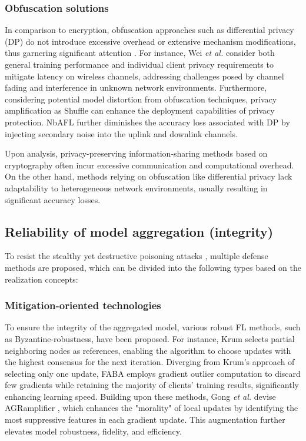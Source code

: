 \documentclass[lettersize,journal]{IEEEtran}
\begin{document}
\subsubsection{Obfuscation solutions} 

In comparison to encryption, obfuscation approaches such as differential privacy (DP) do not introduce excessive overhead or extensive mechanism modifications, thus garnering significant attention \cite{padala2021federated}. For instance, Wei \textit{et al.} \cite{wei2021low} consider both general training performance and individual client privacy requirements to mitigate latency on wireless channels, addressing challenges posed by channel fading and interference in unknown network environments. Furthermore, considering potential model distortion from obfuscation techniques, privacy amplification as Shuffle \cite{girgis2021shuffled} can enhance the deployment capabilities of privacy protection. NbAFL \cite{wei2020federated-NbAFL} further diminishes the accuracy loss associated with DP by injecting secondary noise into the uplink and downlink channels.

Upon analysis, privacy-preserving information-sharing methods based on cryptography often incur excessive communication and computational overhead. On the other hand, methods relying on obfuscation like differential privacy lack adaptability to heterogeneous network environments, usually resulting in significant accuracy losses.
\subsection{Reliability of model aggregation (integrity)}%
To resist the stealthy yet destructive poisoning attacks \cite{lyu2023poisoning}, multiple defense methods are proposed, which can be divided into the following types based on the realization concepts:
\subsubsection{Mitigation-oriented technologies} 
To ensure the integrity of the aggregated model, various robust FL methods, such as Byzantine-robustness, have been proposed. For instance, Krum \cite{blanchard2017machine-krum} selects partial neighboring nodes as references, enabling the algorithm to choose updates with the highest consensus for the next iteration. Diverging from Krum's approach of selecting only one update, FABA \cite{xia2019faba} employs gradient outlier computation to discard few gradients while retaining the majority of clients' training results, significantly enhancing learning speed. Building upon these methods, Gong \textit{et al.} devise AGRamplifier \cite{gong2023agramplifier}, which enhances the "morality" of local updates by identifying the most suppressive features in each gradient update. This augmentation further elevates model robustness, fidelity, and efficiency. 
\end{document}
